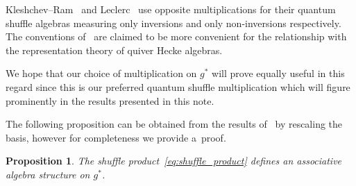 \documentclass[11pt]{article}
\numberwithin{equation}{section}
\newtheorem{Proposition}[Theorem]{Proposition}
{ \theoremstyle{definition}
\newtheorem{Definition}[Theorem]{Definition}
\newtheorem{Example}[Theorem]{Example}
\newtheorem{Remark}[Theorem]{Remark}
}
\begin{document}
\begin{Remark}
Kleshchev--Ram~\cite{kleshchev-ram1} and Leclerc~\cite{leclerc} use opposite multiplications for their quantum shuf\/f\/le
algebras measuring only inversions and only non-inversions respectively.
The conventions of~\cite{kleshchev-ram1} are claimed to be more convenient for the relationship with the representation
theory of quiver Hecke algebras.

We hope that our choice of multiplication on $g^*$ will prove equally useful in this regard since this is our preferred
quantum shuf\/f\/le multiplication which will f\/igure prominently in the results presented in this note.
\end{Remark}

The following proposition can be obtained from the results of~\cite{leclerc} by rescaling the basis, however for
completeness we provide a~proof.

\begin{Proposition}%
The shuffle product~\eqref{eq:shuffle_product} defines an associative algebra structure on $g^*$.
\end{Proposition}
\end{document}
